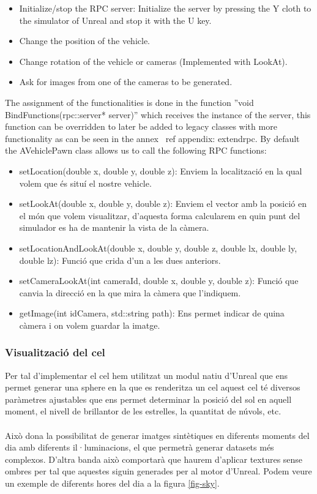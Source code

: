 \documentclass[10pt,a4paper,twocolumn,twoside]{article}
\begin{document}
\begin{itemize}
\item Initialize/stop the RPC server: Initialize the server by pressing the Y cloth to the simulator of Unreal and stop it with the U key.
\item Change the position of the vehicle.
\item Change rotation of the vehicle or cameras (Implemented with LookAt).
\item Ask for images from one of the cameras to be generated.
\end{itemize}

The assignment of the functionalities is done in the function ''void BindFunctions(rpc::server* server)'' which receives the instance of the server, this function can be overridden to later be added to legacy classes with more functionality as can be seen in the annex \ ref {appendix: extendrpc}. By default the AVehiclePawn class allows us to call the following RPC functions:

\begin{itemize}
\item setLocation(double x, double y, double z): Enviem la localització en la qual volem que és situí el nostre vehicle.

\item setLookAt(double x, double y, double z): Enviem el vector amb la posició en el món que volem visualitzar, d'aquesta forma calcularem en quin punt del simulador es ha de mantenir la vista de la càmera.

\item setLocationAndLookAt(double x, double y, double z, double lx, double ly, double lz): Funció que crida d'un a les dues anteriors.

\item setCameraLookAt(int cameraId, double x, double y, double z): Funció que canvia la direcció en la que mira la càmera que l'indiquem.

\item getImage(int idCamera, std::string path): Ens permet indicar de quina càmera i on volem guardar la imatge.
\end{itemize}

\subsubsection{Visualització del cel}
Per tal d'implementar el cel hem utilitzat un modul natiu d'Unreal que ens permet generar una sphere en la que es renderitza un cel aquest cel té diversos paràmetres ajustables que ens permet determinar la posició del sol en aquell moment, el nivell de brillantor de les estrelles, la quantitat de núvols, etc. 
\\\\
Això dona la possibilitat de generar imatges sintètiques en diferents moments del dia amb diferents il·luminacions, el que permetrà generar datasets més complexos. D'altra banda això comportarà que haurem d'aplicar textures sense ombres per tal que aquestes siguin generades per al motor d'Unreal. Podem veure un exemple de diferents hores del dia a la figura \ref{fig-sky}.
\end{document}
